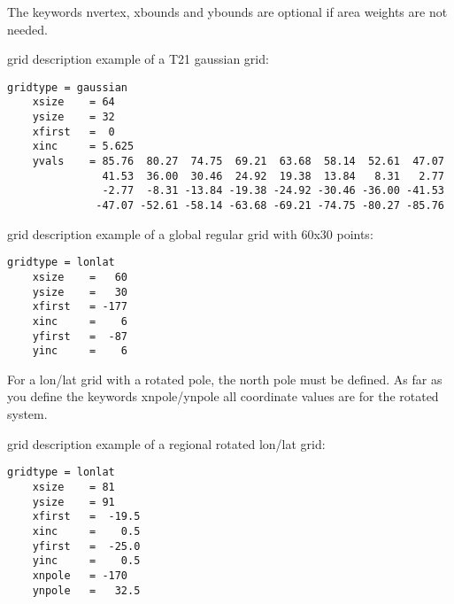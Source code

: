 \vspace{3mm}

The keywords nvertex, xbounds and ybounds are optional if area weights are not needed.

\vspace{2mm}

{\CDO} grid description example of a T21 gaussian grid:
\begin{lstlisting}[frame=single, backgroundcolor=\color{pyellow}, basicstyle=\footnotesize]
    gridtype = gaussian
    xsize    = 64
    ysize    = 32
    xfirst   =  0
    xinc     = 5.625
    yvals    = 85.76  80.27  74.75  69.21  63.68  58.14  52.61  47.07
               41.53  36.00  30.46  24.92  19.38  13.84   8.31   2.77
               -2.77  -8.31 -13.84 -19.38 -24.92 -30.46 -36.00 -41.53
              -47.07 -52.61 -58.14 -63.68 -69.21 -74.75 -80.27 -85.76
\end{lstlisting}

\vspace{2mm}

{\CDO} grid description example of a global regular grid with 60x30 points:
\begin{lstlisting}[frame=single, backgroundcolor=\color{pyellow}, basicstyle=\footnotesize]
    gridtype = lonlat
    xsize    =   60
    ysize    =   30
    xfirst   = -177
    xinc     =    6
    yfirst   =  -87
    yinc     =    6
\end{lstlisting}

\vspace{2mm}

For a lon/lat grid with a rotated pole, the north pole must be defined.
As far as you define the keywords xnpole/ynpole all coordinate values
are for the rotated system.

\vspace{2mm}

{\CDO} grid description example of a regional rotated lon/lat grid:
\begin{lstlisting}[frame=single, backgroundcolor=\color{pyellow}, basicstyle=\footnotesize]
    gridtype = lonlat
    xsize    = 81
    ysize    = 91
    xfirst   =  -19.5
    xinc     =    0.5
    yfirst   =  -25.0
    yinc     =    0.5
    xnpole   = -170
    ynpole   =   32.5
\end{lstlisting}

